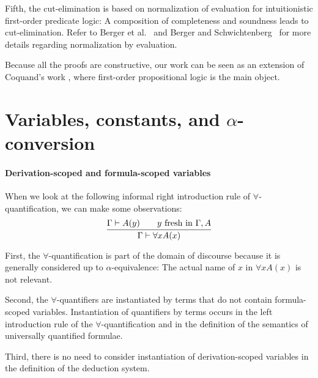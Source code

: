 \documentclass{svjour3}                     %
\newcommand{\seq}[2]{\infer{#2}{#1}}
\begin{document}

Fifth, the cut-elimination is based on normalization of evaluation for intuitionistic first-order predicate logic: A composition of completeness and soundness leads to cut-elimination. Refer to Berger et al.~\cite{nbe98} and Berger and Schwichtenberg~\cite{nbe} for more details regarding normalization by evaluation.

Because all the proofs are constructive, our work can be seen as an extension of Coquand's work \cite{cCoquand93,cCoquand02}, where first-order propositional logic is the main object. 

\section{Variables, constants, and $\alpha$-conversion}\label{representation}

\paragraph{Derivation-scoped and formula-scoped variables}\label{representation}
When we look at the following informal right introduction rule of $\forall$-quantification, we can make some observations:
\[
\seq{\Gamma \vdash A(y) \qquad \mbox{$y$ fresh in $\Gamma, A$}}
    {\Gamma \vdash \forall x A(x)}
\]

First, the $\forall$-quantification is part of the domain of
discourse because it is generally considered up to $\alpha$-equivalence:
The actual name of $x$ in $\forall x A(x)$ is not relevant.

Second, the $\forall$-quantifiers are instantiated by terms that do not
contain formula-scoped variables. Instantiation of quantifiers by
terms occurs in the left introduction rule of the 
$\forall$-quantification and in the definition of the semantics of universally quantified formulae.

Third, there is no need to consider instantiation of derivation-scoped
variables in the definition of the deduction system.
\end{document}
